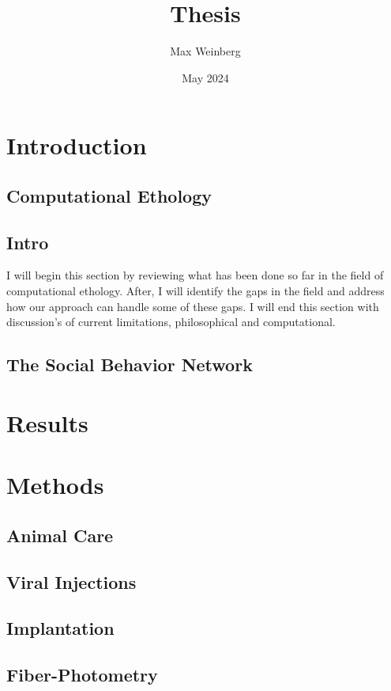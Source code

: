 \documentclass[12pt,english]{article}
\title{Thesis}
\author{Max Weinberg}
\date{May 2024}
\begin{document}
\maketitle
\section{Introduction}
\subsection{Computational Ethology}
\subsection{Intro}
I will begin this section by reviewing what has been done so far in the field of computational ethology. After, I will identify the gaps in the field and address how our approach can handle some of these gaps. I will end this section with discussion's of current limitations, philosophical and computational. 

\subsection{The Social Behavior Network}

\section{Results}

\section{Methods}

\subsection{Animal Care}

\subsection{Viral Injections}

\subsection{Implantation}

\subsection{Fiber-Photometry}
\end{document}
